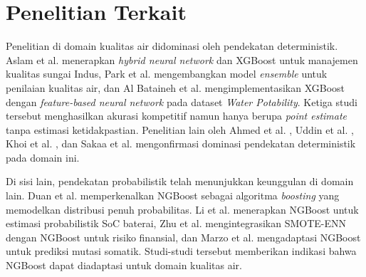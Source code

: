 \documentclass[metlit,article,accept,pdftex,moreauthors]{Definitions/mdpi}
\begin{document}
\section{Penelitian Terkait}

Penelitian di domain kualitas air didominasi oleh pendekatan deterministik. Aslam et al. \cite{aslam2022water} menerapkan \textit{hybrid neural network} dan XGBoost untuk manajemen kualitas sungai Indus, Park et al. \cite{park2022ensemble} mengembangkan model \textit{ensemble} untuk penilaian kualitas air, dan Al Bataineh et al. \cite{albataineh2026hybrid} mengimplementasikan XGBoost dengan \textit{feature-based neural network} pada dataset \textit{Water Potability}. Ketiga studi tersebut menghasilkan akurasi kompetitif namun hanya berupa \textit{point estimate} tanpa estimasi ketidakpastian. Penelitian lain oleh Ahmed et al. \cite{ahmed2022water}, Uddin et al. \cite{uddin2022review}, Khoi et al. \cite{khoi2022water}, dan Sakaa et al. \cite{sakaa2022water} mengonfirmasi dominasi pendekatan deterministik pada domain ini.

Di sisi lain, pendekatan probabilistik telah menunjukkan keunggulan di domain lain. Duan et al. \cite{duan2020ngboost} memperkenalkan NGBoost sebagai algoritma \textit{boosting} yang memodelkan distribusi penuh probabilitas. Li et al. \cite{li2024battery} menerapkan NGBoost untuk estimasi probabilistik SoC baterai, Zhu et al. \cite{zhu2023hybrid} mengintegrasikan SMOTE-ENN dengan NGBoost untuk risiko finansial, dan Marzo et al. \cite{marzo2021ngboost} mengadaptasi NGBoost untuk prediksi mutasi somatik. Studi-studi tersebut memberikan indikasi bahwa NGBoost dapat diadaptasi untuk domain kualitas air.

\begin{table}[H]
\caption{Perbandingan Penelitian Terdahulu}
\label{tab:perbandingan_penelitian}
\centering
{}
\end{table}
\end{document}

